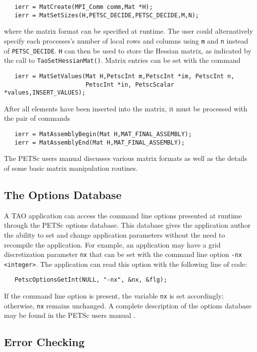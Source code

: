\begin{verbatim}
   ierr = MatCreate(MPI_Comm comm,Mat *H);
   ierr = MatSetSizes(H,PETSC_DECIDE,PETSC_DECIDE,M,N);
\end{verbatim}
\noindent
where the matrix format can be specified at runtime.  The user could
alternatively specify each processes's number of local rows and columns
using \texttt{m} and \texttt{n} instead of \texttt{PETSC\_DECIDE}.  
\texttt{H} can then be used to store
the Hessian matrix, as indicated by the call to
\texttt{TaoSetHessianMat()}.  Matrix entries can be set with the
command
\begin{verbatim}
   ierr = MatSetValues(Mat H,PetscInt m,PetscInt *im, PetscInt n,
                       PetscInt *in, PetscScalar *values,INSERT_VALUES);
\end{verbatim}
\noindent
After %
all elements have been inserted into the
matrix, it must be processed with the pair of commands

\begin{verbatim}
   ierr = MatAssemblyBegin(Mat H,MAT_FINAL_ASSEMBLY);
   ierr = MatAssemblyEnd(Mat H,MAT_FINAL_ASSEMBLY);
\end{verbatim}
\noindent
The PETSc users manual \cite{petsc-user-ref} discusses
various matrix formats as
well as the details of some basic matrix manipulation routines.


\subsection*{The Options Database}
\label{sec:options}
A TAO application can access the command line options presented at
runtime through the PETSc options database. This database gives the application
author the ability to set and change application parameters without
the need to recompile the application. For example, 
an application may have a grid discretization parameter \texttt{nx}
that can be set with the command line option \texttt{-nx <integer>}.
The application can read this option with the following line of code:
\begin{verbatim}
   PetscOptionsGetInt(NULL, "-nx", &nx, &flg);
\end{verbatim}
\noindent
If the command line option is present, the variable \texttt{nx} is set
accordingly; otherwise, \texttt{nx} remains unchanged. A complete
description of the options database may be found in the PETSc users
manual \cite{petsc-user-ref}.

\subsection*{Error Checking}


